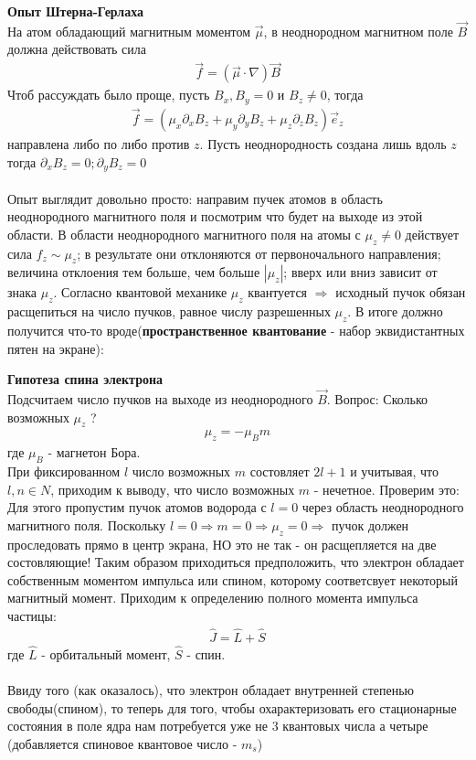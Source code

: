 \documentclass[__main__.tex]{subfiles}
\begin{document}
	\textbf{Опыт Штерна-Герлаха}\\
	На атом обладающий магнитным моментом $\vec{\mu}$, в неоднородном магнитном поле $\vec{B}$ должна действовать сила
	\begin{gather*}
		\vec{f} = \left(\vec{\mu}\cdot\nabla\right)\vec{B}
	\end{gather*}
	Чтоб рассуждать было проще, пусть $B_x, B_y = 0$  и $B_z \neq 0$, тогда
	\begin{gather*}
		\vec{f} = \left(\mu_x\partial_xB_z+\mu_y\partial_yB_z+\mu_z\partial_zB_z\right)\vec{e}_z
	\end{gather*}
	направлена либо по либо против $z$. Пусть неоднородность создана лишь вдоль $z$ тогда $\partial_xB_z=0; \partial_yB_z=0$\\\\
	Опыт выглядит довольно просто: направим пучек атомов в область неоднородного магнитного поля и посмотрим что будет на выходе из этой области.
	В области неоднородного магнитного поля на атомы с $\mu_z \neq 0$ действует сила $f_z \sim \mu_z$; в результате они отклоняются от первоночального направления; величина отклоения тем больше, чем больше $|\mu_z|$; вверх или вниз зависит от знака $\mu_z$.
	Согласно квантовой механике $\mu_z$ квантуется $\Rightarrow$ исходный пучок обязан расщепиться на число пучков, равное числу разрешенных $\mu_z$. В итоге должно получится что-то вроде(\textbf{пространственное квантование} - набор эквидистантных пятен на экране):
	\newpage
	\begin{figure}[h]
		\center{\texttt{[image: ch-18]}}
	\end{figure}
	
	\textbf{Гипотеза спина электрона}\\
	Подсчитаем число пучков на выходе из неоднородного $\vec{B}$. Вопрос: Сколько возможных $\mu_z$ ?
	\begin{gather*}
		\mu_z = -\mu_Bm
	\end{gather*}
	где $\mu_B$ - магнетон Бора.\\
	При фиксированном $l$ число возможных $m$ состовляет $2l+1$ и учитывая, что $l,n \in N$, приходим к выводу, что число возможных $m$ - нечетное. Проверим это:\\
	Для этого пропустим пучок атомов водорода с $l=0$ через область неоднородного магнитного поля. Поскольку $l = 0 \Rightarrow m = 0 \Rightarrow \mu_z = 0 \Rightarrow$ пучок должен проследовать прямо в центр экрана, НО это не так - он расщепляется на две состовляющие! Таким образом приходиться предположить, что электрон обладает собственным моментом импульса или спином, которому соответсвует некоторый магнитный момент. Приходим к определению полного момента импульса частицы:
	\begin{gather*}
		\hat{J} = \hat{L}+\hat{S}
	\end{gather*} 
	где $\hat{L}$ - орбитальный момент, $\hat{S}$ - спин.\\\\
	Ввиду того (как оказалось), что электрон обладает внутренней степенью свободы(спином), то теперь для того, чтобы охарактеризовать его стационарные состояния в поле ядра нам потребуется уже не 3 квантовых числа а четыре (добавляется спиновое квантовое число - $m_s$)
\end{document}
